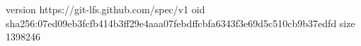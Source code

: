 version https://git-lfs.github.com/spec/v1
oid sha256:07ed09eb3fcfb414b3ff29e4aaa07febdffcbfa6343f3e69d5c510cb9b37edfd
size 1398246
